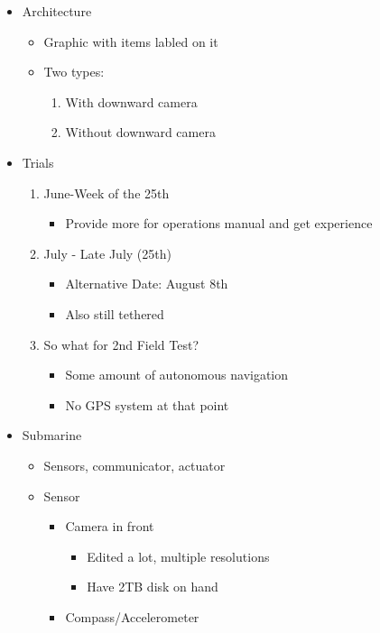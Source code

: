 \documentclass[12pt]{article}
\begin{document}
\begin{itemize}
				\item Architecture
				\begin{itemize}
					\item Graphic with items labled on it
					\item Two types:
					\begin{enumerate}
						\item With downward camera
						\item Without downward camera
					\end{enumerate}
				\end{itemize}
				\item Trials
				\begin{enumerate}
					\item June-Week of the 25th
					\begin{itemize}
						\item Provide more for operations manual and get experience
					\end{itemize}
					\item July - Late July (25th)
					\begin{itemize}
						\item Alternative Date: August 8th
						\item Also still tethered
					\end{itemize}
					\item So what for 2nd Field Test?
					\begin{itemize}
						\item Some amount of autonomous navigation
						\item No GPS system at that point
					\end{itemize}
				\end{enumerate}
				\item Submarine
				\begin{itemize}
					\item Sensors, communicator, actuator
					\item Sensor
					\begin{itemize}
						\item Camera in front
						\begin{itemize}
							\item Edited a lot, multiple resolutions
							\item Have 2TB disk on hand
						\end{itemize}
						\item Compass/Accelerometer
						\begin{itemize}

\end{itemize}
\end{itemize}
\end{itemize}
\end{itemize}
\end{document}
